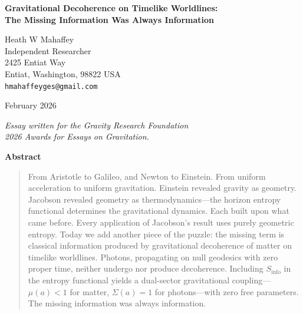 \documentclass[12pt]{article}
\begin{document}

\begin{center}
{\Large \textbf{Gravitational Decoherence on Timelike Worldlines:\\
The Missing Information Was Always Information}}

\vspace{12pt}

Heath W Mahaffey\\
Independent Researcher\\
2425 Entiat Way\\
Entiat, Washington, 98822
USA\\
\texttt{hmahaffeyges@gmail.com}

\vspace{12pt}

February 2026

\vspace{12pt}

\textit{Essay written for the Gravity Research Foundation\\
2026 Awards for Essays on Gravitation.}

\vspace{18pt}

\textbf{Abstract}
\end{center}

\begin{quote}
\noindent
From Aristotle to Galileo, and Newton to Einstein.  From uniform
acceleration to uniform gravitation.  Einstein revealed gravity as
geometry.  Jacobson revealed geometry as thermodynamics---the horizon
entropy functional determines the gravitational dynamics.  Each built upon
what came before.  Every application of Jacobson's result uses purely
geometric entropy.  Today we add another piece of the puzzle: the missing
term is classical information produced by gravitational decoherence of
matter on timelike worldlines.  Photons, propagating on null geodesics with
zero proper time, neither undergo nor produce decoherence.  Including
$S_{\mathrm{info}}$ in the entropy functional yields a dual-sector
gravitational coupling---$\mu(a) < 1$ for matter, $\Sigma(a) = 1$ for
photons---with zero free parameters.  The missing information was always
information.
\end{quote}

\newpage

\end{document}
